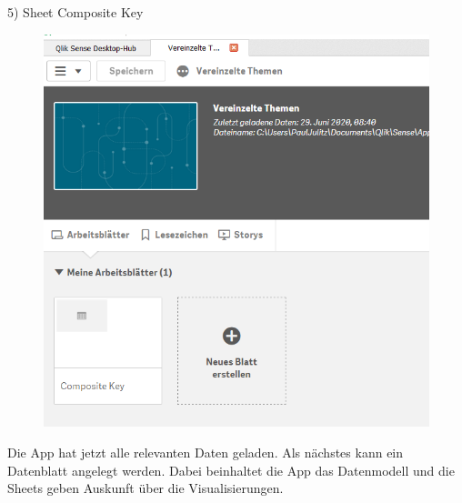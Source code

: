 5) Sheet Composite Key
\begin{figure}[H]
	\centering
	\includegraphics[scale = 0.3]{attachment/chapter_3/Scc023}
	\caption{}
	\label{fig:Scc023}
\end{figure}
Die App hat jetzt alle relevanten Daten geladen. Als nächstes kann ein Datenblatt angelegt werden. Dabei beinhaltet die App das Datenmodell und die Sheets geben Auskunft über die Visualisierungen.

